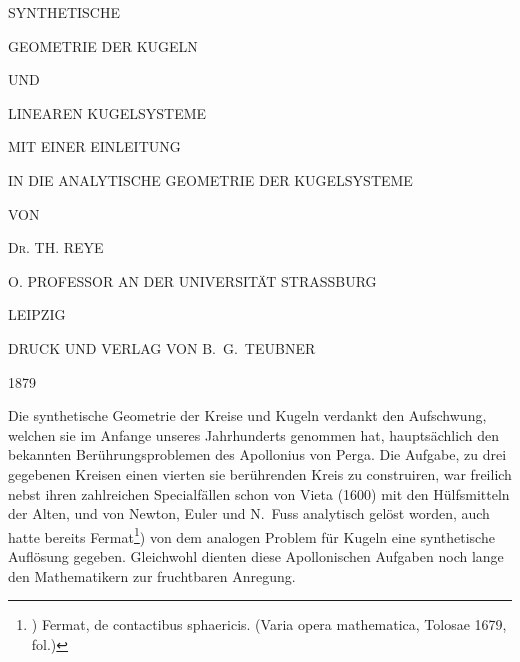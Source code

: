 
\frontmatter
\thispagestyle{empty}
\begin{center}
\vspace{1cm}

{\LARGE SYNTHETISCHE}
\bigskip\bigskip

{\Huge GEOMETRIE DER KUGELN}
\bigskip\bigskip

{\large UND}
\bigskip\bigskip

{\LARGE LINEAREN KUGELSYSTEME}
\bigskip\bigskip
\bigskip\bigskip

{\large MIT EINER EINLEITUNG}
\bigskip\bigskip

{\large IN DIE ANALYTISCHE GEOMETRIE DER KUGELSYSTEME}
\bigskip\bigskip\bigskip\bigskip

VON
\bigskip\bigskip\bigskip\bigskip

\textsc{\LARGE Dr. TH. REYE}
\bigskip

O. PROFESSOR AN DER UNIVERSIT\"AT STRASSBURG

\vfill

{\large
LEIPZIG \medskip

DRUCK UND VERLAG VON B.~G.~TEUBNER \medskip

1879
}
\end{center}

\newpage
\thispagestyle{empty}
\mainmatter




\hspace{-0.8pt}%
Die synthetische Geometrie der Kreise und Kugeln verdankt
den Auf\-schwung, welchen sie im Anfange unseres
Jahrhunderts genommen hat, haupt\-s\"achlich den bekannten
Ber\"uhrungsproblemen des Apollonius von Perga. Die Aufgabe,
zu drei gegebenen Kreisen einen vierten sie ber\"uhrenden
Kreis zu construiren, war freilich nebst ihren zahlreichen
Specialf\"allen schon von Vieta (1600) mit den H\"ulfsmitteln
der Alten, und von Newton, Euler und N.~Fuss analytisch
gel\"ost worden, auch hatte bereits Fermat\footnote{)
  Fermat, de contactibus sphaericis. (Varia opera mathematica,
  Tolosae 1679, fol.)})
von dem analogen
Problem f\"ur Kugeln eine synthetische Auf\/l\"osung gegeben.
Gleichwohl dienten diese Apollonischen Aufgaben noch lange
den Mathematikern zur fruchtbaren Anregung.

